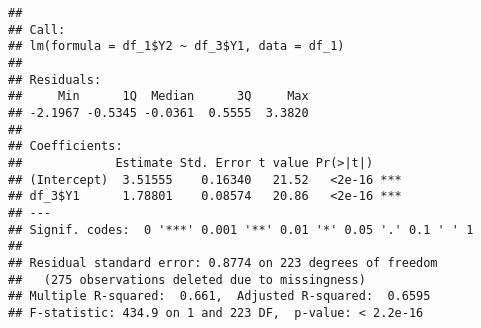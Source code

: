 \documentclass[
]{article}
\newenvironment{Shaded}{\begin{snugshade}}{\end{snugshade}}
\newcommand{\DataTypeTok}[1]{\textcolor[rgb]{0.13,0.29,0.53}{#1}}
\newcommand{\DecValTok}[1]{\textcolor[rgb]{0.00,0.00,0.81}{#1}}
\newcommand{\FloatTok}[1]{\textcolor[rgb]{0.00,0.00,0.81}{#1}}
\newcommand{\KeywordTok}[1]{\textcolor[rgb]{0.13,0.29,0.53}{\textbf{#1}}}
\newcommand{\NormalTok}[1]{#1}
\newcommand{\OperatorTok}[1]{\textcolor[rgb]{0.81,0.36,0.00}{\textbf{#1}}}
\newcommand{\StringTok}[1]{\textcolor[rgb]{0.31,0.60,0.02}{#1}}
\begin{document}
\begin{verbatim}
## 
## Call:
## lm(formula = df_1$Y2 ~ df_3$Y1, data = df_1)
## 
## Residuals:
##     Min      1Q  Median      3Q     Max 
## -2.1967 -0.5345 -0.0361  0.5555  3.3820 
## 
## Coefficients:
##             Estimate Std. Error t value Pr(>|t|)    
## (Intercept)  3.51555    0.16340   21.52   <2e-16 ***
## df_3$Y1      1.78801    0.08574   20.86   <2e-16 ***
## ---
## Signif. codes:  0 '***' 0.001 '**' 0.01 '*' 0.05 '.' 0.1 ' ' 1
## 
## Residual standard error: 0.8774 on 223 degrees of freedom
##   (275 observations deleted due to missingness)
## Multiple R-squared:  0.661,  Adjusted R-squared:  0.6595 
## F-statistic: 434.9 on 1 and 223 DF,  p-value: < 2.2e-16
\end{verbatim}

\begin{Shaded}
\end{Shaded}
\end{document}
